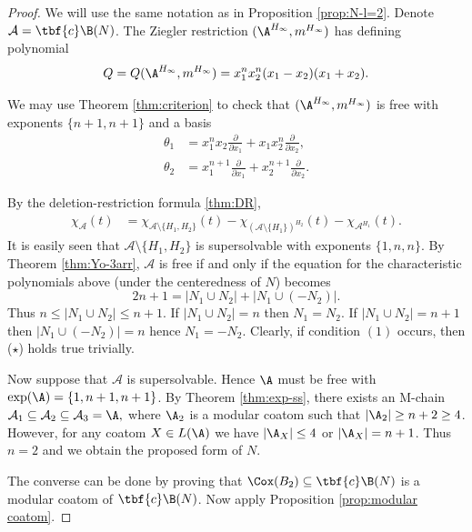 \begin{proof}
We will use the same notation as in Proposition \ref{prop:N-l=2}. 
Denote $ \mathcal{A}=\tbf{c}\B(N)$. 
The Ziegler restriction $(\A^{H_{\infty}}, m^{H_{\infty}})$ has defining polynomial 
$$Q = Q(\A^{H_{\infty}}, m^{H_{\infty}}) =x_{1}^{n}x_{2}^{n} (x_1-x_2)(x_1+x_2).$$

We may use Theorem \ref{thm:criterion} to check that $(\A^{H_{\infty}}, m^{H_{\infty}})$ is free with  exponents $\{n+1 , n+1\}$ and a basis
 \begin{align*}
\theta_1  & =x_{1}^{n}x_2 \frac{\partial}{\partial x_1} + x_{1}  x_{2}^{n}  \frac{\partial}{\partial x_2},\\
\theta_2  & = x_{1}^{n+1} \frac{\partial}{\partial x_1} +   x_{2}^{n+1}  \frac{\partial}{\partial x_2}.
\end{align*}
       
By the deletion-restriction formula \ref{thm:DR}, 
\begin{align*}
{\chi}_\mathcal{A}(t)  & = {\chi}_{\mathcal{A} \setminus \{H_1,H_2\}}( t)-{\chi}_{(\mathcal{A} \setminus \{H_1\})^{H_2}} ( t)-{\chi}_{\mathcal{A}^{H_1}}( t).
\end{align*}
It is easily seen that $\mathcal{A} \setminus \{H_1,H_2\}$ is supersolvable with exponents $\{1, n,n\}$. 
By Theorem \ref{thm:Yo-3arr}, $ \mathcal{A}$ is free  if and only if  the equation for the characteristic polynomials above  (under the centeredness of $N$) becomes 
\begin{equation}
 \label{eq:E}\tag{$\star$}
2n+1 = |N_1 \cup N_2| + |N_1 \cup (-N_2)|.
\end{equation}
Thus $n \le  |N_1 \cup N_2|  \le n+1$. 
If $ |N_1 \cup N_2|=n$ then $N_1 =N_2$. 
If $ |N_1 \cup N_2| = n+1$ then $ |N_1 \cup (-N_2)|=n$ hence $N_1 =-N_2$. 
Clearly, if condition $(1)$ occurs, then ($\star$) holds true trivially. 


Now suppose that  $ \mathcal{A}$ is  supersolvable. 
Hence $\A$ must be free with  $\exp(\A) = \{1,n+1,n+1\}$. 
By  Theorem \ref{thm:exp-ss}, there exists an M-chain $ \mathcal{A}_{1} \subseteq \mathcal{A}_{2} \subseteq \mathcal{A}_{3} = \A,$ where $\A_2$ is a modular coatom such that $|\A_{2}|  \ge n+2 \ge 4$. 
However, for any coatom $X \in L(\A)$ we have $|\A_X| \le 4$ or $|\A_X| =n+1$. 
Thus $n=2$ and we obtain the proposed form of $N$. 

The converse can be done by proving that $ \Cox(B_2)  \subseteq  \tbf{c}\B(N)$ is a modular coatom of $\tbf{c}\B(N)$. 
Now apply  Proposition \ref{prop:modular coatom}. 
\end{proof}



